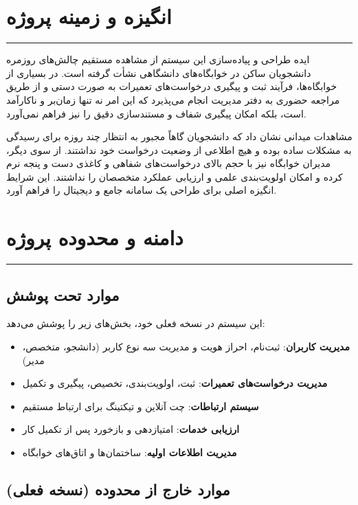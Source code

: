\documentclass[12pt,a4paper]{report}
\begin{document}
	\section{انگیزه و زمینه پروژه}
	\noindent\rule{\textwidth}{0.4pt}
	
	\hspace{-0.1cm}
	ایده طراحی و پیاده‌سازی این سیستم از مشاهده مستقیم چالش‌های روزمره دانشجویان ساکن در خوابگاه‌های دانشگاهی نشأت گرفته است. در بسیاری از خوابگاه‌ها، فرآیند ثبت و پیگیری درخواست‌های تعمیرات به صورت دستی و از طریق مراجعه حضوری به دفتر مدیریت انجام می‌پذیرد که این امر نه تنها زمان‌بر و ناکارآمد است، بلکه امکان پیگیری شفاف و مستندسازی دقیق را نیز فراهم نمی‌آورد.
	
	مشاهدات میدانی نشان داد که دانشجویان گاهاً مجبور به انتظار چند روزه برای رسیدگی به مشکلات ساده بوده و هیچ اطلاعی از وضعیت درخواست خود نداشتند. از سوی دیگر، مدیران خوابگاه نیز با حجم بالای درخواست‌های شفاهی و کاغذی دست و پنجه نرم کرده و امکان اولویت‌بندی علمی و ارزیابی عملکرد متخصصان را نداشتند. این شرایط انگیزه اصلی برای طراحی یک سامانه جامع و دیجیتال را فراهم آورد.
	
	\section{دامنه و محدوده پروژه}
	\noindent\rule{\textwidth}{0.4pt}
	
	\subsection{موارد تحت پوشش}
	
	این سیستم در نسخه فعلی خود، بخش‌های زیر را پوشش می‌دهد:
	
	\begin{itemize}
		\item \textbf{مدیریت کاربران}: ثبت‌نام، احراز هویت و مدیریت سه نوع کاربر (دانشجو، متخصص، مدیر)
		\item \textbf{مدیریت درخواست‌های تعمیرات}: ثبت، اولویت‌بندی، تخصیص، پیگیری و تکمیل
		\item \textbf{سیستم ارتباطات}: چت آنلاین و تیکتینگ برای ارتباط مستقیم
		\item \textbf{ارزیابی خدمات}: امتیازدهی و بازخورد پس از تکمیل کار
		\item \textbf{مدیریت اطلاعات اولیه}: ساختمان‌ها و اتاق‌های خوابگاه
	\end{itemize}
	
	\subsection{موارد خارج از محدوده (نسخه فعلی)}
	
\end{document}
